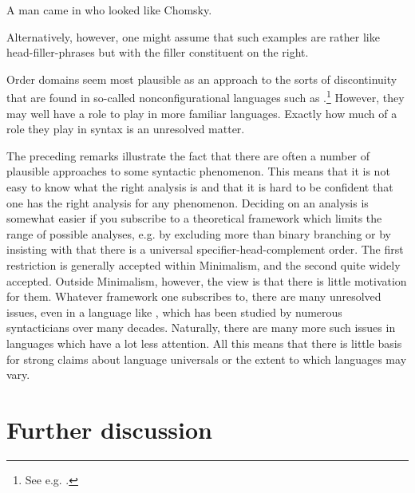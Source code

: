 \documentclass[output=paper]{langsci/langscibook}
\begin{document}
\ea\label{ex:key:4.32}
    A man came in who looked like Chomsky.
\z

\ea\label{ex:key:4.33}
\z
%
Alternatively, however, one might assume that such examples are rather like
head-filler-phrases but with the filler constituent on the right.

Order domains seem most plausible as an approach to the sorts of discontinuity
that are found in so-called nonconfigurational languages such as
.\footnote{ \textrm{See e.g. \citet{DonohueSag1999}.}} However, they
may well have a role to play in more familiar languages. Exactly how much of a
role they play in syntax is an unresolved matter.

The preceding remarks illustrate the fact that there are often a number of
plausible approaches to some syntactic phenomenon. This means that it is not
easy to know what the right analysis is and that it is hard to be confident
that one has the right analysis for any phenomenon. Deciding on an analysis is
somewhat easier if you subscribe to a theoretical framework which limits the
range of possible analyses, e.g. by excluding more than binary branching or by
insisting with \citet{Kayne1994} that there is a universal
specifier-head-complement order. The first restriction is generally accepted
within Minimalism, and the second quite widely accepted. Outside Minimalism,
however, the view is that there is little motivation for them. Whatever
framework one subscribes to, there are many unresolved issues, even in a
language like , which has been studied by numerous syntacticians over
many decades. Naturally, there are many more such issues in languages which
have a lot less attention. All this means that there is little basis for strong
claims about language universals or the extent to which languages may vary.

\section{Further discussion}\label{sec-5:5}
\end{document}
